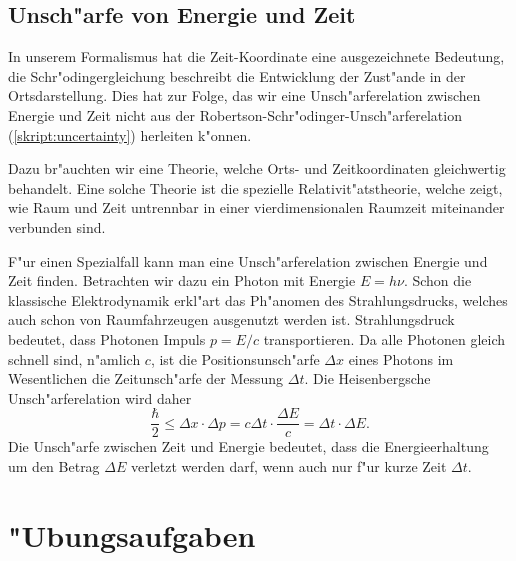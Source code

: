 \subsection{Unsch"arfe von Energie und Zeit}
In unserem Formalismus hat die Zeit-Koordinate eine ausgezeichnete
Bedeutung, die Schr"odingergleichung beschreibt die Entwicklung
der Zust"ande in der Ortsdarstellung.
Dies hat zur Folge, das wir eine Unsch"arferelation zwischen Energie
und Zeit nicht aus der Robertson-Schr"odinger-Unsch"arferelation
(\ref{skript:uncertainty}) herleiten k"onnen.

Dazu br"auchten wir eine Theorie, welche Orts- und Zeitkoordinaten
gleichwertig behandelt.
Eine solche Theorie ist die spezielle Relativit"atstheorie, welche
zeigt, wie Raum und Zeit untrennbar in einer vierdimensionalen
Raumzeit miteinander verbunden sind.

F"ur einen Spezialfall kann man eine Unsch"arferelation zwischen
Energie und Zeit finden.
Betrachten wir dazu ein Photon mit Energie $E=h\nu$.
Schon die klassische Elektrodynamik erkl"art das Ph"anomen des
Strahlungsdrucks, welches auch schon von Raumfahrzeugen ausgenutzt
werden ist.
Strahlungsdruck bedeutet, dass Photonen Impuls $p=E/c$ transportieren.
Da alle Photonen gleich schnell sind, n"amlich $c$, ist die
Positionsunsch"arfe $\Delta x$ eines Photons im Wesentlichen die
Zeitunsch"arfe der Messung $\Delta t$.
Die Heisenbergsche Unsch"arferelation wird daher
\[
\frac{\hbar}2\le \Delta x\cdot\Delta p=c\Delta t\cdot \frac{\Delta E}{c}=
\Delta t\cdot \Delta E.
\]
Die Unsch"arfe zwischen Zeit und Energie bedeutet, dass die
Energieerhaltung um den Betrag $\Delta E$ verletzt werden darf,
wenn auch nur f"ur kurze Zeit $\Delta t$.

\section*{"Ubungsaufgaben}
\begin{uebungsaufgaben}
\item

\item

\item

\end{uebungsaufgaben}
